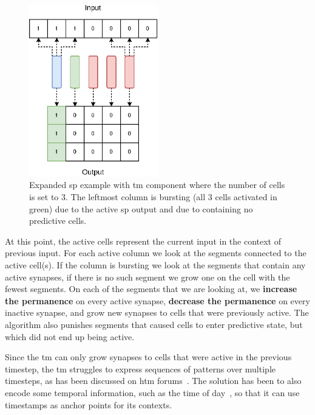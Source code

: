\par
\begin{figure}[htb]
    \centering
    \includegraphics[width=0.5\textwidth]{resources/related_works/tm_vis1.eps}
    \caption[Temporal Memory Workings]{Expanded \gls*{sp} example with \gls*{tm} component where the number of cells is set to 3. The leftmost column is bursting (all 3 cells activated in green) due to the active \gls*{sp} output and due to containing no predictive cells.}
    \label{fig:tm_vis1}
\end{figure}
\par
At this point, the active cells represent the current input in the context of previous input. For each active column we look at the segments connected to the active cell(s). If the column is bursting we look at the segments that contain any active synapses, if there is no such segment we grow one on the cell with the fewest segments. On each of the segments that we are looking at, we \textbf{increase the permanence} on every active synapse, \textbf{decrease the permanence} on every inactive synapse, and grow new synapses to cells that were previously active. The algorithm also punishes segments that caused cells to enter predictive state, but which did not end up being active.
\par
Since the \gls*{tm} can only grow synapses to cells that were active in the previous timestep, the \gls*{tm} struggles to express sequences of patterns over multiple timesteps, as has been discussed on \gls*{htm} forums~\cite{tm_sequence_problem}. The solution has been to also encode some temporal information, such as the time of day~\cite{AHMAD2017134,tm_sequence_problem}, so that it can use timestamps as anchor points for its contexts.
